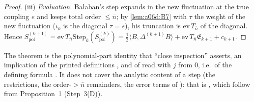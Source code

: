 \begin{proof}
(iii) \emph{Evaluation.} Ba{\l}aban's step expands in the new fluctuation at the true coupling $e$ and keeps total order $\le\bar n$; by \cref{lem:a06d:B7} with $\tau$ the weight of the new fluctuation ($\iota_k$ is the diagonal $\tau=s$), his truncation is $\mathrm{ev}\,T_{\bar n}$ of the diagonal. Hence $S^{(k+1)}_{\mathrm{pol}}=\mathrm{ev}\,T_{\bar n}\mathrm{Step}_k(S^{(k)}_{\mathrm{pol}})=\frac12\langle B,\Delta^{(k+1)}B\rangle+\mathrm{ev}\,T_{\bar n}\mathfrak E_{k+1}+c_{k+1}$.
\end{proof}

The theorem is the polynomial-part identity that ``close inspection'' asserts, an implication of the printed definitions \cite[(2.1)--(2.3), (3.29), (3.33), (3.35), (3.37)]{Ba1}, \cite[(1.2)]{Ba4} and of \cite[(3.34)]{Ba1} read with $j$ from $0$, i.e.\ of the defining formula \cite[(1.3)]{Ba3}. It does not cover the analytic content of a step (the restrictions, the order-$>\bar n$ remainders, the error terms of \cite[(3.26)]{Ba1}): that is \cite[Props.~3.1--3.2]{Ba1}, which follow from Proposition~1 (Step~3(D)).
